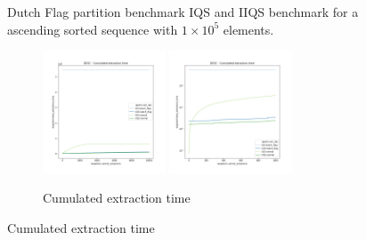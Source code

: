 \begin{figure}
    \caption{Dutch Flag partition benchmark IQS and IIQS benchmark for a ascending sorted sequence with $1\times10^5$ elements.}
    \label{FIG:PARTITION_SCHEME_01_ASCENDING}
\end{figure}




\begin{figure}
    \centering
    \begin{subfigure}[b]{\textwidth}
        \centering
        \includegraphics[width=0.40\textwidth]{./fragments/04_experimental_execution/images/02_basebenchmark_03_sort_d_case.png.0_0.png}
        \includegraphics[width=0.40\textwidth]{./fragments/04_experimental_execution/images/02_basebenchmark_03_sort_d_case.png.0_1.png}
        \caption{Cumulated extraction time}
        \label{FIG:PARTITION_SCHEME_01_DESCENDING__0_0}
    \end{subfigure}


\end{figure}
